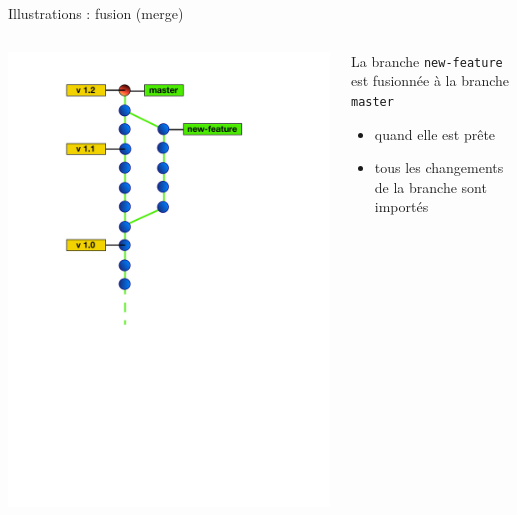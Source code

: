 \begin{frame}[fragile]{%
\protect\hypertarget{illustrations-fusion-merge}{%
Illustrations : fusion (merge)}}

\begin{columns}[T]
\begin{column}{0.40\textwidth}
\includegraphics[height=1.5\textwidth]{images/merge.pdf}
\end{column}

\begin{column}{0.60\textwidth}
La branche \texttt{new-feature} est fusionnée à la branche
\texttt{master}

\begin{itemize}
\tightlist
\item
  quand elle est prête
\item
  tous les changements de la branche sont importés
\end{itemize}
\end{column}
\end{columns}

\end{frame}

